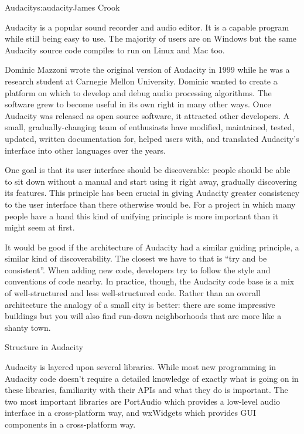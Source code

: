 \begin{aosachapter}{Audacity}{s:audacity}{James Crook}

Audacity is a popular sound recorder and audio editor.  It is a
capable program while still being easy to use.  The majority of users
are on Windows but the same Audacity source code compiles to run on
Linux and Mac too.

Dominic Mazzoni wrote the original version of Audacity in 1999 while
he was a research student at Carnegie Mellon University.  Dominic
wanted to create a platform on which to develop and debug audio
processing algorithms.  The software grew to become useful in its own
right in many other ways.  Once Audacity was released as open source
software, it attracted other developers.  A small, gradually-changing
team of enthusiasts have modified, maintained, tested, updated,
written documentation for, helped users with, and translated
Audacity's interface into other languages over the years.

One goal is that its user interface should be discoverable:
people should be able to sit down without a manual and start using it
right away, gradually discovering its features.  This principle has
been crucial in giving Audacity greater consistency to the user
interface than there otherwise would be.  For a project in which many
people have a hand this kind of unifying principle is more important
than it might seem at first.

It would be good if the architecture of Audacity had a similar guiding
principle, a similar kind of discoverability.  The closest we have to
that is ``try and be consistent''.  When adding new code, developers try
to follow the style and conventions of code nearby.  In practice,
though, the Audacity code base is a mix of well-structured and less
well-structured code.  Rather than an overall architecture the analogy
of a small city is better: there are some impressive buildings but you
will also find run-down neighborhoods that are more like a shanty
town.

\begin{aosasect1}{Structure in Audacity}

Audacity is layered upon several libraries.  While most new
programming in Audacity code doesn't require a detailed knowledge of
exactly what is going on in these libraries, familiarity with their
APIs and what they do is important.  The two most important libraries
are PortAudio which provides a low-level audio interface in a
cross-platform way, and wxWidgets which provides GUI components in a
cross-platform way.


\end{aosasect1}
\end{aosachapter}
